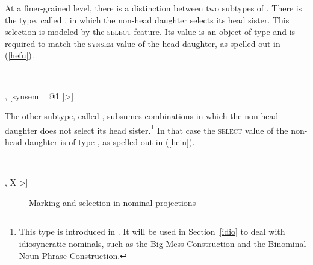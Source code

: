 \documentclass[output=paper
	        ,collection
	        ,collectionchapter
 	        ,biblatex
                ,babelshorthands
                ,newtxmath
                ,draftmode
                ,colorlinks, citecolor=brown
]{langscibook}
\begin{document}
\noindent
At a finer-grained level, there is a distinction between two subtypes of 
. There is the type, called ,  
in which the non-head daughter selects its head sister. This selection is modeled 
by the \textsc{select} feature. Its value is an object of type  and is 
required to match the \textsc{synsem} value of the head daughter, as spelled out 
in (\ref{hefu}).  

\begin{exe}
\ex\label{hefu} 
 ~ \impl ~ \\
\begin{avm}
[dtrs ~ <[synsem|loc|category|head|select ~ @1], [synsem ~ @1 ]>] 
\end{avm}
\end{exe} 

\noindent
The other subtype, called , subsumes combinations in 
which the non-head daughter does not select its head sister.\footnote{This type is 
introduced in \citet[130]{VanEynde98a}. It will be used in Section~\ref{idio} to deal with 
idiosyncratic nominals, such as the Big Mess Construction and the Binominal Noun Phrase 
Construction.} In that case the \textsc{select} value of the non-head daughter is of type 
, as spelled out in (\ref{hein}). 

\begin{exe}
\ex\label{hein} 
 ~ \impl ~\\
\begin{avm}
[dtrs ~ <[synsem|loc|category|head|select ~ \type{none}], X >]
\end{avm}
\end{exe}    

\begin{figure}
\centering
{}
\caption{\label{markyy} Marking and selection in nominal projections}
\end{figure}
\end{document}
